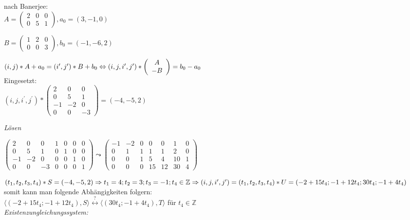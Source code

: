 nach Banerjee:\\

$A=
\left(
\begin{array}{ccc}
2 & 0 & 0\\
0 & 5 & 1
\end{array}
\right), a_0 = (3,-1,0)$

$B=
\left(
\begin{array}{ccc}
1 & 2 & 0\\
0 & 0 & 3
\end{array}
\right), b_0 = (-1, -6, 2)$


$(i,j) * A + a_0 = (i^\prime, j^\prime) * B + b_0 \\
\Leftrightarrow
(i,j,i^\prime,j^\prime) *
\left(
\begin{array}{c}
A\\
-B
\end{array}
\right)
= b_0 - a_0$\\
Eingesetzt:\\
$(i,j,i^\prime,j^\prime) *
\left(
\begin{array}{ccc}
2 & 0 & 0\\
0 & 5 & 1\\
-1&-2 & 0\\
0 & 0 &-3
\end{array}
\right)
= (-4,-5,2)$

\textit{Lösen}

$\left(
\begin{array}{ccc|cccc}
 2 & 0 & 0 & 1 & 0 & 0 & 0 \\
 0 & 5 & 1 & 0 & 1 & 0 & 0 \\
-1 &-2 & 0 & 0 & 0 & 1 & 0 \\
 0 & 0 &-3 & 0 & 0 & 0 & 1
\end{array}
\right) \leadsto \left(
\begin{array}{ccc|cccc}
-1 &-2 & 0 & 0 & 0 & 1 & 0 \\
 0 & 1 & 1 & 1 & 1 & 2 & 0 \\
 0 & 0 & 1 & 5 & 4 &10 & 1 \\
 0 & 0 & 0 &15 &12 &30 & 4
\end{array}
\right)$


$(t_1,t_2,t_3,t_4) * S = (-4, -5, 2) \\
\Rightarrow t_1 = 4; t_2= 3; t_3 = -1; t_4 \in \mathbb{Z} \\
\Rightarrow (i,j,i^\prime,j^\prime) = (t_1,t_2,t_3,t_4) * U =
(-2+15t_4; -1+12t_4; 30t_4; -1+4t_4)$
somit kann man folgende Abhängigkeiten folgern:\\
$\langle (-2 + 15t_4; -1+12t_4), S \rangle \stackrel{?}{\leftrightarrow}
 \langle (30t_4;-1+4t_4), T \rangle$ für $t_4 \in \mathbb{Z}$
~\\
\textit{Existenzungleichungssystem:}\\

